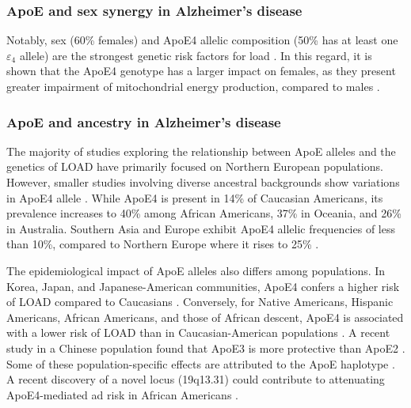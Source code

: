 \documentclass{amsart}
\begin{document}
\subsubsection*{ApoE and sex synergy in Alzheimer's disease}
Notably, sex (60\% females) and ApoE4 allelic composition (50\% has at least one $\varepsilon_4$ allele) are the strongest genetic risk factors for \acrshort{load} \cite{Arnold2020SexMetabolome}. In this regard, it is shown that the ApoE4 genotype has a larger impact on females, as they present greater impairment of mitochondrial energy production, compared to males \cite{Arnold2020SexMetabolome, Yassine2020APOEDisease}.

\subsubsection*{ApoE and ancestry in Alzheimer's disease}
The majority of studies exploring the relationship between ApoE alleles and the genetics of LOAD have primarily focused on Northern European populations\cite{Yang2023ApolipoproteinDisease}. However, smaller studies involving diverse ancestral backgrounds show variations in ApoE4 allele \cite{Yang2023ApolipoproteinDisease}. While ApoE4 is present in 14\% of Caucasian Americans, its prevalence increases to 40\% among African Americans, 37\% in Oceania, and 26\% in Australia. Southern Asia and Europe exhibit ApoE4 allelic frequencies of less than 10\%, compared to Northern Europe where it rises to 25\% \cite{Belloy2019AForward, Egert2012ApoEFactors, Eisenberg2010WorldwideHistory, Logue2011AAmericans}.

The epidemiological impact of ApoE alleles also differs among populations. In Korea, Japan, and Japanese-American communities, ApoE4 confers a higher risk of LOAD compared to Caucasians \cite{Farrer1997EffectsMeta-analysis}. Conversely, for Native Americans, Hispanic Americans, African Americans, and those of African descent, ApoE4 is associated with a lower risk of LOAD than in Caucasian-American populations \cite{Farrer1997EffectsMeta-analysis, Blue2019LocalHispanics, Suchy-Dicey2022APOEStudy, Rajabli2018AncestralPopulations, Naslavsky2022GlobalSample}. A recent study in a Chinese population found that ApoE3 is more protective than ApoE2 \cite{Chen2011ApolipoproteinDisease}. Some of these population-specific effects are attributed to the ApoE haplotype \cite{Blue2019LocalHispanics, Rajabli2018AncestralPopulations}. A recent discovery of a novel locus (19q13.31) could contribute to attenuating ApoE4-mediated \acrshort{ad} risk in African Americans \cite{Rajabli2022AAncestry}.
\end{document}
